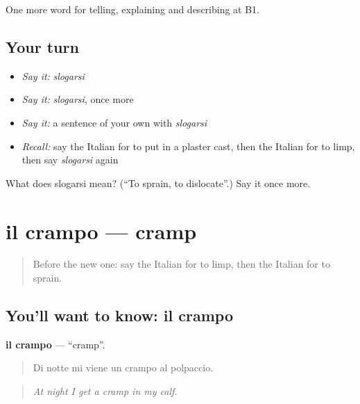\begin{grammarlens}[title={What you've built}]
One more word for telling, explaining and describing at B1.
\end{grammarlens}

\subsection*{Your turn}
\begin{itemize}
\raggedright
  \item \emph{Say it:} \emph{slogarsi}
  \item \emph{Say it:} \emph{slogarsi}, once more
  \item \emph{Say it:} a sentence of your own with \emph{slogarsi}
  \item \emph{Recall:} say the Italian for to put in a plaster cast, then the Italian for to limp, then say \emph{slogarsi} again
\end{itemize}

\begin{tcolorbox}[breakable,colback=teal!4,colframe=teal!35!black,title={Before you move on}]
What does slogarsi mean? (\textquotedblleft{}To sprain, to dislocate\textquotedblright{}.) Say it once more.
\end{tcolorbox}
\section[il crampo]{il crampo — cramp}

\label{lesson:IT-C485-crampo}



\begin{quote}
Before the new one: say the Italian for to limp, then the Italian for to sprain.
\end{quote}

\subsection*{You'll want to know: il crampo}
\textbf{il crampo} — \textquotedblleft{}cramp\textquotedblright{}.

\begin{quote}
Di notte mi viene un crampo al polpaccio.
\end{quote}

\begin{quote}
\emph{At night I get a cramp in my calf.}
\end{quote}

